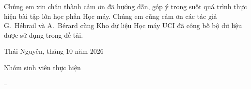 \documentclass[../main.tex]{subfiles}
\begin{document}
Chúng em xin chân thành cảm ơn \gvhd{} đã hướng dẫn, góp ý trong suốt quá trình thực hiện bài tập lớn học phần Học máy. Chúng em cũng cảm ơn các tác giả G.~Hébrail và A.~Bérard cùng Kho dữ liệu Học máy UCI đã công bố bộ dữ liệu được sử dụng trong đề tài.

\vspace{1cm}

\begin{flushright}
Thái Nguyên, tháng 10 năm 2026

Nhóm sinh viên thực hiện

\vspace{2cm}

\tvmot{} -- \tvhai
\end{flushright}
\end{document}
